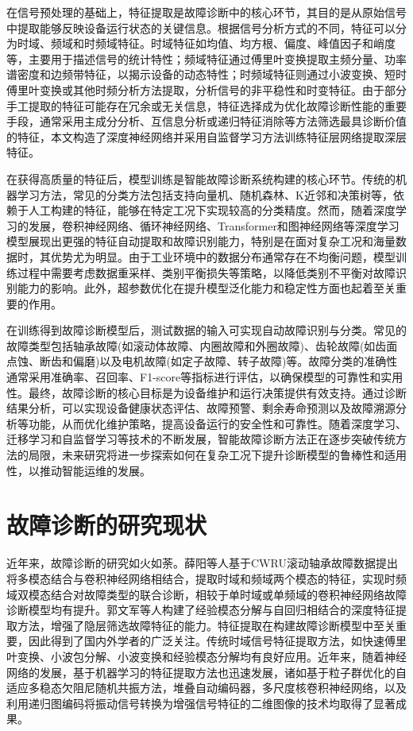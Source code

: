 \documentclass[master]{thesis-uestc}
\begin{document}
在信号预处理的基础上，特征提取是故障诊断中的核心环节，其目的是从原始信号中提取能够反映设备运行状态的关键信息。根据信号分析方式的不同，特征可以分为时域、频域和时频域特征。时域特征如均值、均方根、偏度、峰值因子和峭度等，主要用于描述信号的统计特性；频域特征通过傅里叶变换提取主频分量、功率谱密度和边频带特征，以揭示设备的动态特性；时频域特征则通过小波变换、短时傅里叶变换或其他时频分析方法提取，分析信号的非平稳性和时变特征。由于部分手工提取的特征可能存在冗余或无关信息，特征选择成为优化故障诊断性能的重要手段，通常采用主成分分析、互信息分析或递归特征消除等方法筛选最具诊断价值的特征，本文构造了深度神经网络并采用自监督学习方法训练特征层网络提取深层特征。

在获得高质量的特征后，模型训练是智能故障诊断系统构建的核心环节。传统的机器学习方法，常见的分类方法包括支持向量机、随机森林、K近邻和决策树等，依赖于人工构建的特征，能够在特定工况下实现较高的分类精度。然而，随着深度学习的发展，卷积神经网络、循环神经网络、Transformer和图神经网络等深度学习模型展现出更强的特征自动提取和故障识别能力，特别是在面对复杂工况和海量数据时，其优势尤为明显。由于工业环境中的数据分布通常存在不均衡问题，模型训练过程中需要考虑数据重采样、类别平衡损失等策略，以降低类别不平衡对故障识别能力的影响。此外，超参数优化在提升模型泛化能力和稳定性方面也起着至关重要的作用。

在训练得到故障诊断模型后，测试数据的输入可实现自动故障识别与分类。常见的故障类型包括轴承故障(如滚动体故障、内圈故障和外圈故障)、齿轮故障(如齿面点蚀、断齿和偏磨)以及电机故障(如定子故障、转子故障)等。故障分类的准确性通常采用准确率、召回率、F1-score等指标进行评估，以确保模型的可靠性和实用性。最终，故障诊断的核心目标是为设备维护和运行决策提供有效支持。通过诊断结果分析，可以实现设备健康状态评估、故障预警、剩余寿命预测以及故障溯源分析等功能，从而优化维护策略，提高设备运行的安全性和可靠性。随着深度学习、迁移学习和自监督学习等技术的不断发展，智能故障诊断方法正在逐步突破传统方法的局限，未来研究将进一步探索如何在复杂工况下提升诊断模型的鲁棒性和适用性，以推动智能运维的发展。
\FloatBarrier  %

\section{故障诊断的研究现状}
近年来，故障诊断的研究如火如荼。薛阳等人基于CWRU滚动轴承故障数据提出将多模态结合与卷积神经网络相结合，提取时域和频域两个模态的特征，实现时频域双模态结合对故障类型的联合诊断，相较于单时域或单频域的卷积神经网络故障诊断模型均有提升。郭文军等人构建了经验模态分解与自回归相结合的深度特征提取方法，增强了隐层筛选故障特征的能力。特征提取在构建故障诊断模型中至关重要，因此得到了国内外学者的广泛关注。传统时域信号特征提取方法，如快速傅里叶变换、小波包分解、小波变换和经验模态分解均有良好应用。近年来，随着神经网络的发展，基于机器学习的特征提取方法也迅速发展，诸如基于粒子群优化的自适应多稳态欠阻尼随机共振方法，堆叠自动编码器，多尺度核卷积神经网络，以及利用递归图编码将振动信号转换为增强信号特征的二维图像的技术均取得了显著成果。
\end{document}

